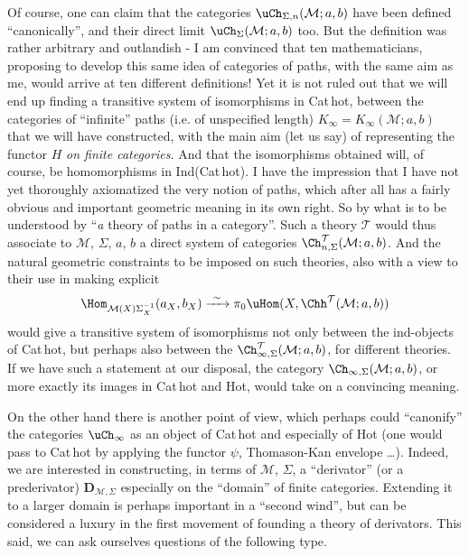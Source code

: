 Of course, one can claim that the categories $\uCh_{\Sigma,n}(\mathcal{M}; a, b)$ have been defined ``canonically'', and their direct limit $\uCh_{\Sigma}(\mathcal{M}; a, b)$ too. But the definition was rather arbitrary and outlandish - I am convinced that ten mathematicians, proposing to develop this same idea of categories of paths, with the same aim as me, would arrive at ten different definitions! Yet it is not ruled out that we will end up finding a transitive system of isomorphisms in Cat\,hot, between the categories of ``infinite'' paths (i.e. of unspecified length) $K_\infty = K_\infty(\mathcal{M}; a, b)$ that we will have constructed, with the
main aim (let us say) of representing the functor $H$ \textit{on finite categories.} And that the isomorphisms obtained will, of course, be homomorphisms in Ind(Cat\,hot). I have the impression that I have not yet thoroughly axiomatized the very notion of paths, which after all has a fairly obvious and important geometric meaning in its own right. So by what is to be understood by ``\textit{a} theory of paths in a category''. Such a theory $\mathcal{T}$ would thus associate to $\mathcal{M}$, $\Sigma$, $a$, $b$ a direct system of categories $\Ch^{\mathcal{T}}_{n,\Sigma}(\mathcal{M}; a, b)$. And the natural geometric constraints to be imposed on such theories, also with a view to their use in making explicit
\[
\Hom_{\mathcal{M}(X)\Sigma_X^{-1}}(a_X, b_X) \xrightarrow{\ \sim\ } \pi_0\uHom(X, \Chh^{\mathcal{T}}(\mathcal{M}; a, b)) %
\]
would give a transitive system of isomorphisms not only between the ind-objects of Cat\,hot, but perhaps also between the $\Ch^{\mathcal{T}}_{\infty,\Sigma}(\mathcal{M}; a, b)$, for different theories. If we have such a statement at our disposal, the category $\Ch_{\infty,\Sigma}(\mathcal{M}; a, b)$, or more exactly its images in Cat\,hot and Hot, %
would take on a convincing meaning.

On the other hand there is another point of view, which perhaps could ``canonify'' the categories $\uCh_\infty$ as an object of Cat\,hot and especially of Hot (one would pass to Cat\,hot by applying the functor $\psi$, Thomason-Kan envelope \ldots). Indeed, we are interested in constructing, in terms of $\mathcal{M}$, $\Sigma$, a ``derivator'' (or a prederivator) $\mathbf{D}_{\mathcal{M},\Sigma}$ especially on the ``domain'' of finite categories. Extending it to a larger domain is perhaps important in a ``second wind'', but can be considered a luxury in the first movement of founding a theory of derivators. This said, we can ask ourselves questions of the following type.

